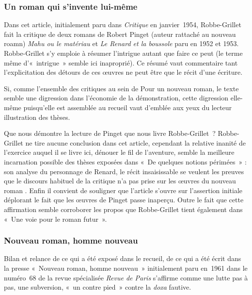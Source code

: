 \documentclass[12pt, a4paper]{article}
\begin{document}
\subsubsection{Un roman qui s'invente lui-même}
Dans cet article, initialement paru dans \textit{Critique} en janvier~1954, Robbe-Grillet fait la critique de deux romans de Robert Pinget (auteur rattaché au nouveau roamn) \textit{Mahu ou le matériau} et \textit{Le Renard et la boussole} paru en 1952 et 1953. Robbe-Grillet s'y emploie à résumer l'intrigue autant que faire ce peut (le terme même d'«~intrigue~» semble ici inaproprié). Ce résumé vaut commentaire tant l'explicitation des détours de ces œuvres ne peut être que le récit d'une écriture.

Si, comme l'ensemble des critiques au sein de Pour un nouveau roman, le texte semble une digression dans l'économie de la démonstration, cette digression elle-même puisqu'elle est assemblée au recueil vaut d'emblée aux yeux du lecteur illustration des thèses.

Que nous démontre la lecture de Pinget que nous livre Robbe-Grillet~? Robbe-Grillet ne tire aucune conclusion dans cet article, cependant la relative inanité de l'exercice auquel il se livre ici, dénouer le fil de l'aventure, semble la meilleure incarnation possible des thèses exposées dans «~De quelques notions périmées~» : son analyse du personnage de Renard, le récit insaisissable se veulent les preuves que le discours habituel de la critique n'a pas prise sur les œuvres du nouveau roman%
. Enfin il convient de souligner que l'article s'ouvre sur l'assertion initiale déplorant le fait que les œuvres de Pinget passe inaperçu. Outre le fait que cette affirmation semble corroborer les propos que Robbe-Grillet tient également dans «~Une voie pour le roman futur~».%
	
	



\subsubsection{Nouveau roman, homme nouveau}
Bilan et relance de ce qui a été exposé dans le recueil, de ce qui a été écrit dans la presse «~Nouveau roman, homme nouveau~» initialement paru en~1961 dans le numéro~68 de la revue spécialisée \textit{Revue de Paris} s'affirme comme une lutte pas à pas, une subversion, «~un contre pied~» contre la \textit{doxa} fautive.
\end{document}
